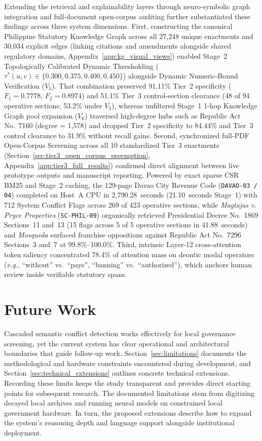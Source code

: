 Extending the retrieval and explainability layers through neuro-symbolic graph integration and full-document open-corpus auditing further substantiated these findings across three system dimensions. First, constructing the canonical Philippine Statutory Knowledge Graph across all 27,248 unique enactments and 30,034 explicit edges (linking citations and amendments alongside shared regulatory domains, Appendix~\ref{app:kg_visual_views}) enabled Stage~2 Topologically Calibrated Dynamic Thresholding ($\tau^*(u, v) \in \{0.300, 0.375, 0.400, 0.450\}$) alongside Dynamic Numeric-Bound Verification ($V_5$). That combination preserved 91.11\% Tier~2 specificity ($F_1 = 0.7778$, $F_2 = 0.8974$) and 51.1\% Tier~3 control-section clearance (48 of 94 operative sections; 53.2\% under $V_3$), whereas unfiltered Stage~1 1-hop Knowledge Graph pool expansion ($V_6$) traversed high-degree hubs such as Republic Act No.~7160 (degree = 1,578) and dropped Tier~2 specificity to 84.44\% and Tier~3 control clearance to 31.9\% without recall gains. Second, synchronized full-PDF Open-Corpus Screening across all 10 standardized Tier~3 enactments (Section~\ref{sec:tier3_open_corpus_preemption}, Appendix~\ref{app:tier3_full_results}) confirmed direct alignment between live prototype outputs and manuscript reporting. Powered by exact sparse CSR BM25 and Stage~2 caching, the 129-page Davao City Revenue Code (\texttt{DAVAO-03 / 04}) completed on Host~A CPU in 2,790.28~seconds (21.10~seconds Stage~1) with 712 System Conflict Flags across 269 of 423 operative sections, while \textit{Magtajas v. Pryce Properties} (\texttt{SC-PHIL-09}) organically retrieved Presidential Decree No.~1869 Sections~11 and~13 (15 flags across 5 of 5 operative sections in 41.88~seconds) and \textit{Mosqueda} surfaced franchise oppositions against Republic Act No.~7296 Sections~3 and~7 at 99.8\%--100.0\%. Third, intrinsic Layer-12 cross-attention token saliency concentrated 78.4\% of attention mass on deontic modal operators (\textit{e.g.}, ``without'' vs.\ ``pays'', ``banning'' vs.\ ``authorized''), which anchors human review inside verifiable statutory spans.


\section{Future Work}
\label{sec:future_work}

Cascaded semantic conflict detection works effectively for local governance screening, yet the current system has clear operational and architectural boundaries that guide follow-up work. Section~\ref{sec:limitations} documents the methodological and hardware constraints encountered during development, and Section~\ref{sec:technical_extensions} outlines concrete technical extensions. Recording these limits keeps the study transparent and provides direct starting points for subsequent research. The documented limitations stem from digitizing decayed local archives and running neural models on constrained local government hardware. In turn, the proposed extensions describe how to expand the system's reasoning depth and language support alongside institutional deployment.


